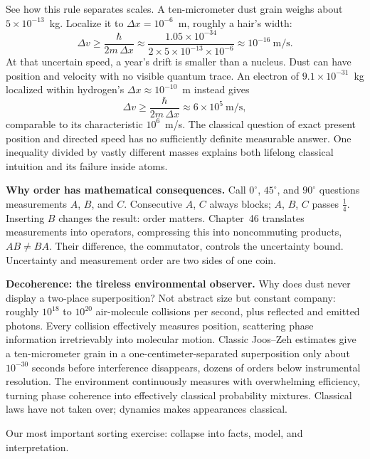 See how this rule separates scales. A ten-micrometer dust grain weighs about $5\times10^{-13}$~kg. Localize it to $\Delta x=10^{-6}$~m, roughly a hair's width:
\[
\Delta v\geq\frac{\hbar}{2m\,\Delta x}\approx\frac{1.05\times10^{-34}}{2\times5\times10^{-13}\times10^{-6}}\approx10^{-16}\ \text{m/s}.
\]
At that uncertain speed, a year's drift is smaller than a nucleus. Dust can have position and velocity with no visible quantum trace. An electron of $9.1\times10^{-31}$~kg localized within hydrogen's $\Delta x\approx10^{-10}$~m instead gives
\[
\Delta v\geq\frac{\hbar}{2m\,\Delta x}\approx6\times10^{5}\ \text{m/s},
\]
comparable to its characteristic $10^6$~m/s. The classical question of exact present position and directed speed has no sufficiently definite measurable answer. One inequality divided by vastly different masses explains both lifelong classical intuition and its failure inside atoms.

\begin{challenge}
\textbf{Why order has mathematical consequences.} Call $0^\circ$, $45^\circ$, and $90^\circ$ questions measurements $A$, $B$, and $C$. Consecutive $A$, $C$ always blocks; $A$, $B$, $C$ passes $\tfrac14$. Inserting $B$ changes the result: order matters. Chapter~46 translates measurements into operators, compressing this into noncommuting products, $AB\neq BA$. Their difference, the commutator, controls the uncertainty bound. Uncertainty and measurement order are two sides of one coin.

\textbf{Decoherence: the tireless environmental observer.} Why does dust never display a two-place superposition? Not abstract size but constant company: roughly $10^{18}$ to $10^{20}$ air-molecule collisions per second, plus reflected and emitted photons. Every collision effectively measures position, scattering phase information irretrievably into molecular motion. Classic Joos--Zeh estimates give a ten-micrometer grain in a one-centimeter-separated superposition only about $10^{-30}$ seconds before interference disappears, dozens of orders below instrumental resolution. The environment continuously measures with overwhelming efficiency, turning phase coherence into effectively classical probability mixtures. Classical laws have not taken over; dynamics makes appearances classical.
\end{challenge}


Our most important sorting exercise: collapse into facts, model, and interpretation.

